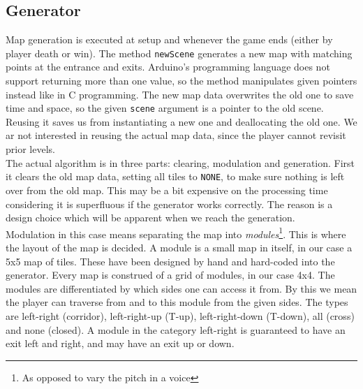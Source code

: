 \subsection{Generator} %
Map generation is executed at setup and whenever the game ends (either by player death or win). The method {\tt newScene} generates a new map with matching points at the entrance and exits. Arduino's programming language does not support returning more than one value, so the method manipulates given pointers instead like in C programming. The new map data overwrites the old one to save time and space, so the given {\tt scene} argument is a pointer to the old scene.  Reusing it saves us from instantiating a new one and deallocating the old one.  We ar not interested in reusing the actual map data, since the player cannot revisit prior levels.\\
The actual algorithm is in three parts: clearing, modulation and generation. First it clears the old map data, setting all tiles to {\tt NONE}, to make sure nothing is left over from the old map. This may be a bit expensive on the processing time considering it is superfluous if the generator works correctly. The reason is a design choice which will be apparent when we reach the generation.\\ %
Modulation in this case means separating the map into \emph{modules}\footnote{As opposed to vary the pitch in a voice}. This is where the layout of the map is decided. A module is a small map in itself, in our case a 5x5 map of tiles.  These have been designed by hand and hard-coded into the generator. Every map is construed of a grid of modules, in our case 4x4. The modules are differentiated by which sides one can access it from.  By this we mean the player can traverse from and to this module from the given sides.  The types are left-right (corridor), left-right-up (T-up), left-right-down (T-down), all (cross) and none (closed). A module in the category left-right is guaranteed to have an exit left and right, and may have an exit up or down.\\
